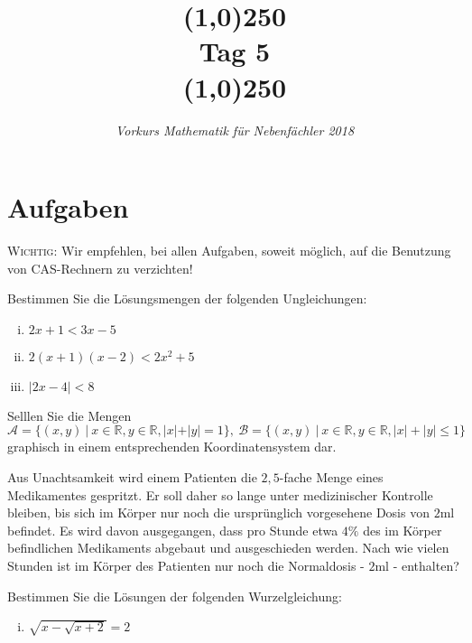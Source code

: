 \documentclass[11pt]{article}
\begin{document}
\title{\line(1,0){250}\\Tag 5\\\line(1,0){250}}
\date{}
\author{\itshape Vorkurs Mathematik für Nebenfächler 2018}
\maketitle

\section*{Aufgaben}
\textsc{Wichtig:} Wir empfehlen, bei allen Aufgaben, soweit möglich, auf die Benutzung von CAS-Rechnern zu verzichten!
\begin{task}
	Bestimmen Sie die L\"osungsmengen der folgenden Ungleichungen: 
	\begin{enumerate}[i)]
		\item $2x+1<3x-5$
		\item $2(x+1)(x-2)<2x^2+5$
		\item $|2x-4|<8$
	\end{enumerate}
\end{task}
\begin{task}
	Selllen Sie die Mengen
	\[
	\mathcal{A}=\{(x,y)~|~x\in \mathbb{R},y\in \mathbb{R},|x|+|y| = 1\},~\mathcal{B} = \{(x,y)~|~x\in \mathbb{R},y\in \mathbb{R},|x|+|y|\leq 1\}
	\]
	graphisch in einem entsprechenden Koordinatensystem dar.
\end{task}
\dotfill
\begin{task}
Aus Unachtsamkeit wird einem Patienten die $2,5$-fache Menge eines Medikamentes gespritzt. Er soll daher so lange unter medizinischer Kontrolle bleiben, bis sich im K\"orper nur noch die urspr\"unglich vorgesehene Dosis von $2$ml befindet. Es wird davon ausgegangen, dass pro Stunde etwa $4\%$ des im K\"orper befindlichen Medikaments abgebaut und ausgeschieden werden. Nach wie vielen Stunden ist im K\"orper des Patienten nur noch die Normaldosis - $2$ml - enthalten?
\end{task}
\begin{task}
	Bestimmen Sie die L\"osungen der folgenden Wurzelgleichung:
	\begin{enumerate}[i)]
		\item $\sqrt{x-\sqrt{x+2}}=2$
	\end{enumerate}  
\end{task}

\end{document}
